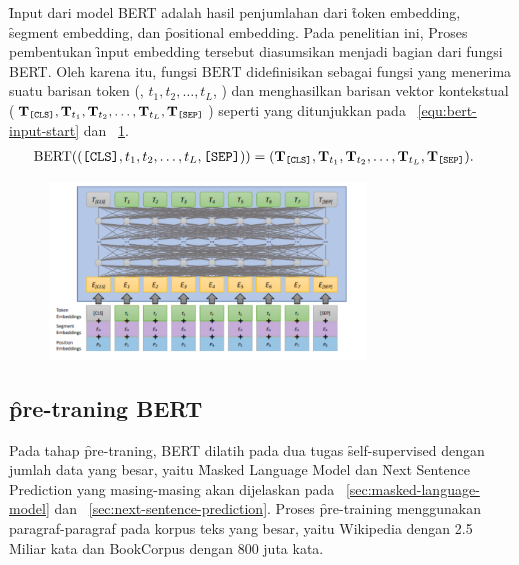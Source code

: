 \f{Input} dari model BERT adalah hasil penjumlahan dari \f{token embedding}, \f{segment embedding}, dan \f{positional embedding}. Pada penelitian ini, Proses pembentukan \f{input embedding} tersebut diasumsikan menjadi bagian dari fungsi BERT. Oleh karena itu, fungsi $\text{BERT}$ didefinisikan sebagai fungsi yang menerima suatu barisan token (\code{[CLS]}, $t_1, t_2, \dots, t_L$, \code{[SEP]}) dan menghasilkan barisan vektor kontekstual ($\mathbf{T}_{\text{\texttt{[CLS]}}}, \mathbf{T}_{t_1}, \mathbf{T}_{t_2}, \dots, \mathbf{T}_{t_L}, \mathbf{T}_{\text{\texttt{[SEP]}}}$) seperti yang ditunjukkan pada \equ~\ref{equ:bert-input-start} dan \pic~\ref{fig:input-representation}.
\begin{align}
	\label{equ:bert-input-start}
	\text{BERT}((\text{\texttt{[CLS]}}, t_1, t_2, \dots, t_L, \text{\texttt{[SEP]}})) &= (\mathbf{T}_{\text{\texttt{[CLS]}}}, \mathbf{T}_{t_1}, \mathbf{T}_{t_2}, \dots, \mathbf{T}_{t_L}, \mathbf{T}_{\text{\texttt{[SEP]}}}).
\end{align}
\begin{figure}[!ht]
	\centering
	\includegraphics[width=0.75\textwidth]{assets/pics/representasibert.png}
	\label{fig:input-representation}
\end{figure}

\subsection{\f{pre-traning} BERT}

	Pada tahap \f{pre-traning}, BERT dilatih pada dua tugas \f{self-supervised} dengan jumlah data yang besar, yaitu \f{Masked Language Model} dan \f{Next Sentence Prediction} yang masing-masing akan dijelaskan pada \sect~\ref{sec:masked-language-model} dan \sect~\ref{sec:next-sentence-prediction}. Proses \f{pre-training} menggunakan paragraf-paragraf pada korpus teks yang besar, yaitu Wikipedia dengan 2.5 Miliar kata dan BookCorpus dengan 800 juta kata.


